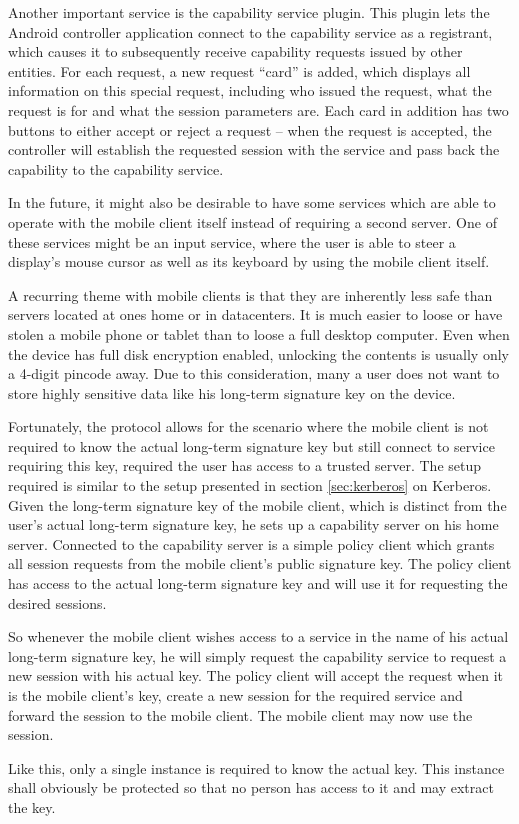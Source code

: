 Another important service is the capability service plugin.
This plugin lets the Android controller application connect to the capability service as a registrant, which causes it to subsequently receive capability requests issued by other entities.
For each request, a new request ``card'' is added, which displays all information on this special request, including who issued the request, what the request is for and what the session parameters are.
Each card in addition has two buttons to either accept or reject a request -- when the request is accepted, the controller will establish the requested session with the service and pass back the capability to the capability service.

In the future, it might also be desirable to have some services which are able to operate with the mobile client itself instead of requiring a second server.
One of these services might be an input service, where the user is able to steer a display's mouse cursor as well as its keyboard by using the mobile client itself.

\bigskip

A recurring theme with mobile clients is that they are inherently less safe than servers located at ones home or in datacenters.
It is much easier to loose or have stolen a mobile phone or tablet than to loose a full desktop computer.
Even when the device has full disk encryption enabled, unlocking the contents is usually only a 4-digit pincode away.
Due to this consideration, many a user does not want to store highly sensitive data like his long-term signature key on the device.

Fortunately, the protocol allows for the scenario where the mobile client is not required to know the actual long-term signature key but still connect to service requiring this key, required the user has access to a trusted server.
The setup required is similar to the setup presented in section \ref{sec:kerberos} on Kerberos.
Given the long-term signature key of the mobile client, which is distinct from the user's actual long-term signature key, he sets up a capability server on his home server.
Connected to the capability server is a simple policy client which grants all session requests from the mobile client's public signature key.
The policy client has access to the actual long-term signature key and will use it for requesting the desired sessions.

So whenever the mobile client wishes access to a service in the name of his actual long-term signature key, he will simply request the capability service to request a new session with his actual key.
The policy client will accept the request when it is the mobile client's key, create a new session for the required service and forward the session to the mobile client.
The mobile client may now use the session.

Like this, only a single instance is required to know the actual key.
This instance shall obviously be protected so that no person has access to it and may extract the key.

